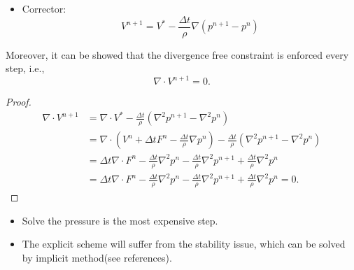 \begin{refsection}
\begin{lemma}
\begin{itemize}
		\item Corrector:
		$$V^{n+1} = V^* - \frac{\Delta t}{\rho} \nabla (p^{n+1} - p^n)$$
	\end{itemize}
	Moreover, it can be showed that the divergence free constraint is enforced every step, i.e., 
	$$\nabla \cdot V^{n+1} = 0.$$
\end{lemma}
\begin{proof}
	\begin{align*}
	\nabla \cdot V^{n+1} & = \nabla \cdot V^* - \frac{\Delta t}{\rho} (\nabla^2 p^{n+1} - \nabla^2 p^n) \\
	&= \nabla \cdot (V^n + \Delta t F^n  - \frac{\Delta t}{\rho} \nabla p^n ) - \frac{\Delta t}{\rho} (\nabla^2 p^{n+1} - \nabla^2 p^n) \\
	&=\Delta t \nabla \cdot F^n - \frac{\Delta t}{\rho} \nabla^2 p^n - \frac{\Delta t}{\rho} \nabla^2 p^{n+1} + \frac{\Delta t}{\rho} \nabla^2 p^{n} \\
	&=\Delta t \nabla \cdot F^n - \frac{\Delta t}{\rho} \nabla^2 p^n - \frac{\Delta t}{\rho} \nabla^2 p^{n+1} + \frac{\Delta t}{\rho} \nabla^2 p^{n} = 0.
	\end{align*}
\end{proof}

\begin{remark}\hfill
	\begin{itemize}
		\item Solve the pressure is the most expensive step.
		\item The explicit scheme will suffer from the stability issue, which can be solved by implicit method(see references). 
	\end{itemize}
\end{remark}


\end{refsection}
